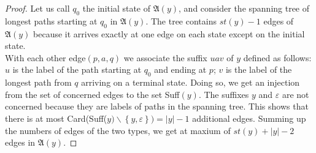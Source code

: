 \documentclass[11pt]{report}
\begin{document}
\begin{proof}
  Let us call $q_0$ the initial state of $\mathfrak{A}(y)$, and
  consider the spanning tree of longest paths starting at $q_0$ in
  $\mathfrak{A}(y)$. The tree contains $st(y) - 1$ edges of
  $\mathfrak{A}(y)$ because it arrives exactly at one edge on each
  state except on the initial state.\\
  With each other edge$(p,a,q)$ we associate the suffix $uav$ of $y$
  defined as follows: $u$ is the label of the path starting at $q_0$
  and ending at $p$; $v$ is the label of the longest path from $q$
  arriving on a terminal state. Doing so, we get an injection from the
  set of concerned edges to the set Suff$(y)$. The suffixes $y$ and
  $\varepsilon$ are not concerned because they are labels of paths in
  the spanning tree. This shows that there is at most
  Card(Suff($y)\backslash \left\{y, \varepsilon\right\})=|y|-1$
  additional edges. Summing up the numbers of edges of the two types,
  we get at maxium of $st(y) + |y| - 2$ edges in $\mathfrak{A}(y)$.
\end{proof}
\end{document}
